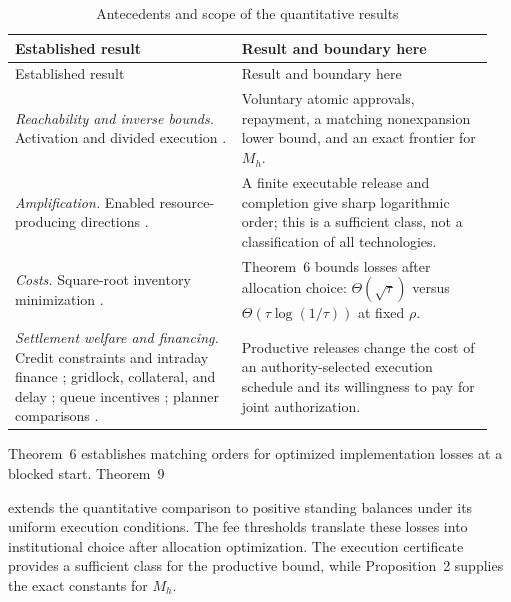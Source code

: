 \documentclass[ecta,draft,supplement]{econsocart}
\theoremstyle{definition}
\theoremstyle{definition}
\begin{document}
\begin{appendix}
\begin{longtable}{@{}p{0.45\linewidth}p{0.50\linewidth}@{}}
\caption{Antecedents and scope of the quantitative results}
\label{tab:literatureboundary}\\
\toprule
Established result & Result and boundary here\\
\midrule
\endfirsthead
\toprule
Established result & Result and boundary here\\
\midrule
\endhead
\emph{Reachability and inverse bounds.} Activation and divided execution
\citep[Lemma~13, Theorem~20]{FracaHaddad2015}. & Voluntary atomic approvals,
repayment, a matching nonexpansion lower bound, and an exact frontier for
$M_h$.\\[3pt]
\emph{Amplification.} Enabled resource-producing directions
\citep[Theorem~25]{FracaHaddad2015}. & A finite executable release and
completion give sharp logarithmic order; this is a sufficient class,
not a classification of all technologies.\\[3pt]
\emph{Costs.} Square-root inventory minimization \citep{Baumol1952}. &
Theorem~6%
 bounds losses after allocation choice:
$\Theta(\sqrt\tau)$ versus $\Theta(\tau\log(1/\tau))$ at fixed $\rho$.\\[3pt]
\emph{Settlement welfare and financing.} Credit constraints and intraday
finance \citep{KahnRoberds2001}; gridlock, collateral, and delay
\citep{KahnMcAndrewsRoberds2003}; queue incentives
\citep{MartinMcAndrews2008}; planner comparisons
\citep{AtalayMartinMcAndrews2010}. &
Productive releases change the cost of an authority-selected execution
schedule and its willingness to pay for joint authorization.\\
\bottomrule
\end{longtable}

Theorem~6%
 establishes matching orders for optimized
implementation losses at a blocked start. Theorem~9%

extends the quantitative comparison to positive standing balances under its
uniform execution conditions. The fee thresholds translate these losses into
institutional choice after allocation optimization. The execution certificate
provides a sufficient class for the productive bound, while
Proposition~2%
 supplies the exact constants for $M_h$.

\end{appendix}
\end{document}
